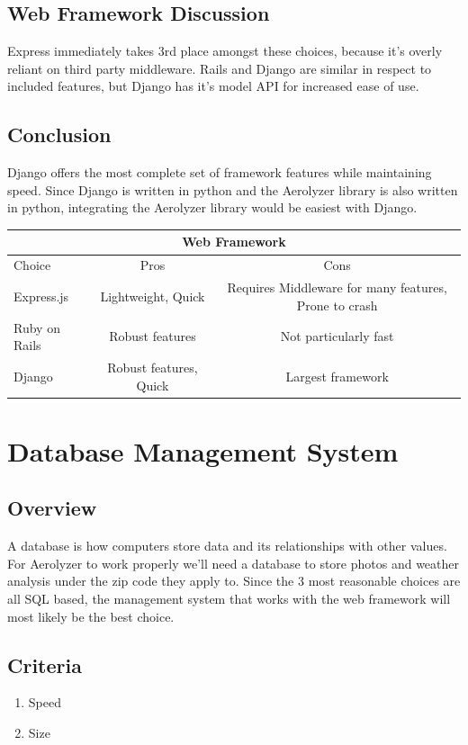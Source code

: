 \documentclass[onecolumn, draftclsnofoot,10pt, compsoc]{IEEEtran}
\begin{document}
\begin{singlespace}
\subsection{Web Framework Discussion}
Express immediately takes 3rd place amongst these choices, because it's overly reliant on third party middleware\cite{Express}. Rails and Django are similar in respect to included features, but Django has it's model API for increased ease of use\cite{Rails}\cite{DjangoOver}. 
\subsection{Conclusion}
Django offers the most complete set of framework features while maintaining speed. Since Django is written in python and the Aerolyzer library is also written in python, integrating the Aerolyzer library would be easiest with Django. \cite{DjangoOver}
\begin{center}
	\begin{tabular}{|l|c|c|} 
		\hline
		\multicolumn{3}{|c|}{Web Framework} \\
		\hline
		Choice & Pros & Cons\\ [0.5ex] 
		\hline\hline
		Express.js & Lightweight, Quick & Requires Middleware for many features, Prone to crash \\ 
		\hline
		Ruby on Rails & Robust features & Not particularly fast\\
		\hline
		Django & Robust features, Quick & Largest framework\\ [1ex] 
		\hline
	\end{tabular}
\end{center}


\section{Database Management System}
\subsection{Overview}
A database is how computers store data and its relationships with other values. For Aerolyzer to work properly we'll need a database to store photos and weather analysis under the zip code they apply to. Since the 3 most reasonable choices are all SQL based, the management system that works with the web framework will most likely be the best choice.
\subsection{Criteria}
\begin{enumerate}
	\item Speed
	\item Size
\end{enumerate}

\end{singlespace}
\end{document}
